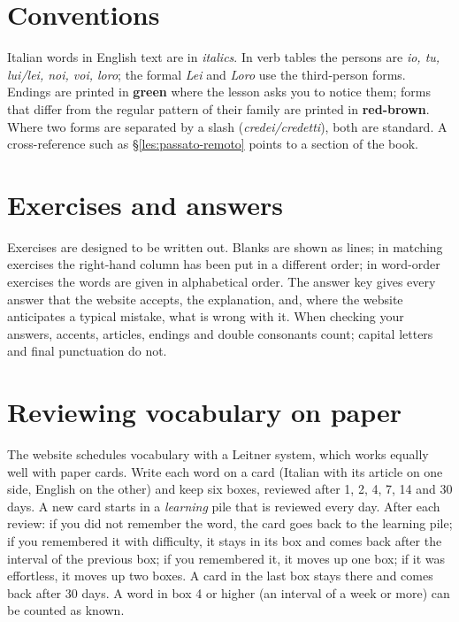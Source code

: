 \documentclass[11pt,a4paper,twoside,openright]{book}
\newcommand{\irr}[1]{{\color{exccol}\bfseries #1}}
\newcommand{\hlending}[1]{{\color{accent}\bfseries #1}}
\begin{document}
\section*{Conventions}

Italian words in English text are in \textit{italics}. In verb tables the persons are \textit{io, tu, lui/lei, noi, voi, loro}; the formal \textit{Lei} and \textit{Loro} use the third-person forms. Endings are printed in \hlending{green} where the lesson asks you to notice them; forms that differ from the regular pattern of their family are printed in \irr{red-brown}. Where two forms are separated by a slash (\textit{credei/credetti}), both are standard. A cross-reference such as \S\ref{les:passato-remoto} points to a section of the book.

\section*{Exercises and answers}

Exercises are designed to be written out. Blanks are shown as lines; in matching exercises the right-hand column has been put in a different order; in word-order exercises the words are given in alphabetical order. The answer key gives every answer that the website accepts, the explanation, and, where the website anticipates a typical mistake, what is wrong with it. When checking your answers, accents, articles, endings and double consonants count; capital letters and final punctuation do not.

\section*{Reviewing vocabulary on paper}

The website schedules vocabulary with a Leitner system, which works equally well with paper cards. Write each word on a card (Italian with its article on one side, English on the other) and keep six boxes, reviewed after 1, 2, 4, 7, 14 and 30 days. A new card starts in a \emph{learning} pile that is reviewed every day. After each review: if you did not remember the word, the card goes back to the learning pile; if you remembered it with difficulty, it stays in its box and comes back after the interval of the previous box; if you remembered it, it moves up one box; if it was effortless, it moves up two boxes. A card in the last box stays there and comes back after 30 days. A word in box 4 or higher (an interval of a week or more) can be counted as known.
\end{document}
